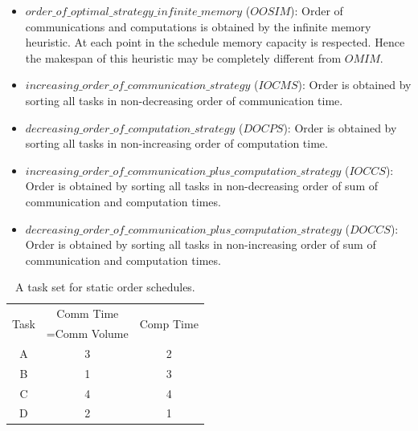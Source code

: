 \documentclass[sigconf]{acmart}
\begin{document}
	\begin{itemize}[a)]
		\item $order\_of\_optimal\_strategy\_infinite\_memory $ ($OOSIM$): Order of communications and computations is obtained by the infinite memory heuristic. At each point in the schedule memory capacity is respected. Hence the makespan of this heuristic may be completely different from $OMIM$.
		
		\item $increasing\_order\_of\_communication\_strategy$ ($IOCMS$): Order is obtained by sorting all tasks in non-decreasing order of communication time. 
		
		\item $decreasing\_order\_of\_computation\_strategy$ ($DOCPS$): Order is obtained by sorting all tasks in non-increasing order of computation time. 
		\item $increasing\_order\_of\_communication\_plus\_computation\_strategy$ ($IOCCS$): Order is obtained by sorting all tasks in non-decreasing order of sum of communication and computation times.
		\item $decreasing\_order\_of\_communication\_plus\_computation\_strategy$ ($DOCCS$): Order is obtained by sorting all tasks in non-increasing order of sum of communication and computation times.
		
	\end{itemize}
	\begin{table}[htb]
		\begin{center}
			
			\begin{tabular}{|c|c|c|}
				\hline
				\multirow{2}{*}{Task} & Comm Time & \multirow{2}{*}{Comp Time}\\ 
				&=Comm Volume& \\ \hline
				A & 3 & 2\\ \hline
				B & 1 & 3\\ \hline
				C & 4 & 4\\ \hline
				D & 2 & 1\\ \hline
			\end{tabular}
			\caption{\label{tab:staticOrderExample} A task set for static order schedules.}
		\end{center}
	\end{table}
	
\end{document}
